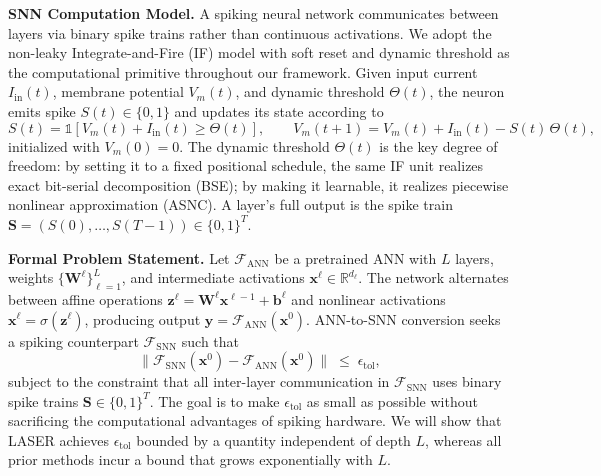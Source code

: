 \documentclass{article}
\theoremstyle{plain}
\theoremstyle{definition}
\theoremstyle{remark}
\begin{document}
\noindent\textbf{SNN Computation Model.}
\label{subsec:snn_model}
A spiking neural network communicates between layers via binary spike trains rather
than continuous activations. We adopt the non-leaky Integrate-and-Fire (IF) model
with soft reset and dynamic threshold as the computational primitive throughout our
framework. Given input current $I_{\mathrm{in}}(t)$, membrane potential $V_m(t)$,
and dynamic threshold $\Theta(t)$, the neuron emits spike $S(t) \in \{0,1\}$ and
updates its state according to
\begin{equation}
\label{eq:if_forward}
S(t) = \mathbb{1}\!\left[V_m(t) + I_{\mathrm{in}}(t) \ge \Theta(t)\right], \qquad
V_m(t{+}1) = V_m(t) + I_{\mathrm{in}}(t) - S(t)\,\Theta(t),
\end{equation}
initialized with $V_m(0) = 0$. The dynamic threshold $\Theta(t)$ is the key degree
of freedom: by setting it to a fixed positional schedule, the same IF unit realizes
exact bit-serial decomposition (BSE); by making it learnable, it realizes piecewise
nonlinear approximation (ASNC). A layer's full output is the spike train
$\mathbf{S} = (S(0), \dots, S(T-1)) \in \{0,1\}^T$.

\noindent\textbf{Formal Problem Statement.}
\label{subsec:problem}
Let $\mathcal{F}_{\mathrm{ANN}}$ be a pretrained ANN with $L$ layers, weights
$\{\mathbf{W}^\ell\}_{\ell=1}^L$, and intermediate activations
$\mathbf{x}^\ell \in \mathbb{R}^{d_\ell}$. The network alternates between affine
operations $\mathbf{z}^\ell = \mathbf{W}^\ell \mathbf{x}^{\ell-1} + \mathbf{b}^\ell$
and nonlinear activations $\mathbf{x}^\ell = \sigma(\mathbf{z}^\ell)$, producing
output $\mathbf{y} = \mathcal{F}_{\mathrm{ANN}}(\mathbf{x}^0)$.
%
ANN-to-SNN conversion seeks a spiking counterpart $\mathcal{F}_{\mathrm{SNN}}$ such
that
\begin{equation}
\label{eq:conversion_goal}
\bigl\|\mathcal{F}_{\mathrm{SNN}}(\mathbf{x}^0)
      - \mathcal{F}_{\mathrm{ANN}}(\mathbf{x}^0)\bigr\| \;\le\; \epsilon_{\mathrm{tol}},
\end{equation}
subject to the constraint that all inter-layer communication in
$\mathcal{F}_{\mathrm{SNN}}$ uses binary spike trains $\mathbf{S} \in \{0,1\}^T$.
The goal is to make $\epsilon_{\mathrm{tol}}$ as small as possible without
sacrificing the computational advantages of spiking hardware. We will show that
LASER achieves $\epsilon_{\mathrm{tol}}$ bounded by a quantity independent of depth
$L$, whereas all prior methods incur a bound that grows exponentially with $L$.
\end{document}
